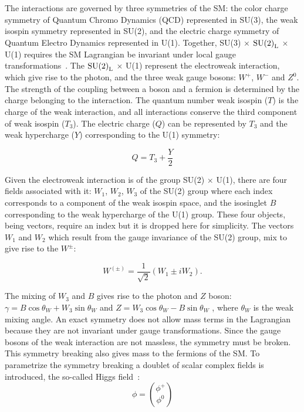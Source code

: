 The interactions are governed by three symmetries of the SM: the color charge 
symmetry of Quantum Chromo Dynamics (QCD) represented in SU(3), the weak isospin symmetry
represented in SU(2), and the electric charge symmetry of Quantum Electro Dynamics represented in U(1). Together, SU(3) 
$\times$  $\rm{SU(2)}_{L}$ $\times$ U(1) requires the SM Lagrangian be invariant under 
local gauge transformations~\cite{perkins2000introduction}. The $\rm{SU(2)}_{L}$ $\times$ U(1) represent the electroweak interaction, 
which give rise to the photon, and the three weak gauge bosons: $W^{+}$, $W^{-}$ and $Z^0$.
The strength of the coupling between a boson and a fermion is determined by the 
charge belonging to the interaction. The quantum number weak isospin ($T$) is the charge 
of the weak interaction, and all interactions conserve the third component of weak isospin ($T_{3}$).
The electric charge ($Q$) can be represented by $T_{3}$ and the weak hypercharge ($Y$) 
corresponding to the U(1) symmetry:

\begin{equation}
\label{eq:Q-charge}
Q = T_{3} + \frac{Y}{2}
\end{equation}

Given the electroweak interaction is of the group SU(2) $\times$ U(1), there are four fields associated 
with it: $W_{1}$, $W_{2}$, $W_{3}$ of the SU(2) group where each index
corresponds to a component of the weak isospin space, and the isosinglet $B$ corresponding
to the weak hypercharge of the U(1) group. These four objects, being vectors, require an index but it 
is dropped here for simplicity. The vectors $W_{1}$ and $W_{2}$ which result from the 
gauge invariance of the SU(2) group, mix to give rise to the $W^{\pm}$:

\begin{equation}
\label{eq:vector-boson}
W^{\left(\pm\right)}= \frac{1}{\sqrt{2}}\left(W_{1} \pm iW_{2}\right).
\end{equation}

The mixing of $W_{3}$ and $B$ gives rise to the photon and $Z$ boson: 
$\gamma = B \cos \theta_W + W_{3} \sin \theta_W$  and $Z = W_{3}\cos \theta_W - B \sin \theta_W$ ,
where $\theta_W$ is the weak mixing angle. An exact symmetry does not allow mass 
terms in the Lagrangian because they are not invariant under gauge transformations.
Since the gauge bosons of the weak interaction are not massless, the symmetry must be broken.
This symmetry breaking also gives mass to the fermions of the SM. To parametrize the symmetry 
breaking a doublet of scalar complex fields is introduced, the so-called
Higgs field~\cite{PhysRevLett.13.508}:
\begin{equation}
\label{eq:higgs-field}
\phi = \binom{\phi^{+}}{\phi^{0}}
\end{equation}

